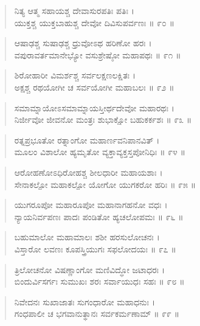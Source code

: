 \begin{verse}
ನಿತ್ಯ ಆತ್ಮ ಸಹಾಯಶ್ಚ ದೇವಾಸುರಪತಿಃ ಪತಿಃ ।\\ಯುಕ್ತಶ್ಚ ಯುಕ್ತಬಾಹುಶ್ಚ ದೇವೋ ದಿವಿಸುಪರ್ವಣಃ \num{॥ ೯೦ ॥}
\end{verse}

\begin{verse}
ಆಷಾಢಶ್ಚ ಸುಷಾಢಶ್ಚ ಧ್ರುವೋಽಥ ಹರಿಣೋ ಹರಃ ।\\ವಪುರಾವರ್ತಮಾನೇಭ್ಯೋ ವಸುಶ್ರೇಷ್ಠೋ ಮಹಾಪಥಃ \num{॥ ೯೧ ॥}
\end{verse}

\begin{verse}
ಶಿರೋಹಾರೀ ವಿಮರ್ಶಶ್ಚ ಸರ್ವಲಕ್ಷಣಲಕ್ಷಿತಃ ।\\ಅಕ್ಷಶ್ಚ ರಥಯೋಗೀ ಚ ಸರ್ವಯೋಗೀ ಮಹಾಬಲಃ \num{॥ ೯೨ ॥}
\end{verse}

\begin{verse}
ಸಮಾಮ್ನಾಯೋಽಸಮಾಮ್ನಾಯಸ್ತೀರ್ಥದೇವೋ ಮಹಾರಥಃ ।\\ನಿರ್ಜೀವೋ ಜೀವನೋ ಮಂತ್ರಃ ಶುಭಾಕ್ಷೋ ಬಹುಕರ್ಕಶಃ \num{॥ ೯೩ ॥}
\end{verse}

\begin{verse}
ರತ್ನಪ್ರಭೂತೋ ರತ್ನಾಂಗೋ ಮಹಾರ್ಣವನಿಪಾನವಿತ್ ।\\ಮೂಲಂ ವಿಶಾಲೋ ಹ್ಯಮೃತೋ ವ್ಯಕ್ತಾವ್ಯಕ್ತಸ್ತಪೋನಿಧಿಃ \num{॥ ೯೪ ॥}
\end{verse}

\begin{verse}
ಆರೋಹಣೋಽಧಿರೋಹಶ್ಚ ಶೀಲಧಾರೀ ಮಹಾಯಶಾಃ ।\\ಸೇನಾಕಲ್ಪೋ ಮಹಾಕಲ್ಪೋ ಯೋಗೋ ಯುಗಕರೋ ಹರಿಃ \num{॥ ೯೫ ॥}
\end{verse}

\begin{verse}
ಯುಗರೂಪೋ ಮಹಾರೂಪೋ ಮಹಾನಾಗಹನೋ ವಧಃ ।\\ನ್ಯಾಯನಿರ್ವಪಣಃ ಪಾದಃ ಪಂಡಿತೋ ಹ್ಯಚಲೋಪಮಃ \num{॥ ೯೬ ॥}
\end{verse}

\begin{verse}
ಬಹುಮಾಲೋ ಮಹಾಮಾಲಃ ಶಶೀ ಹರಸುಲೋಚನಃ ।\\ವಿಸ್ತಾರೋ ಲವಣಃ ಕೂಪಸ್ತ್ರಿಯುಗಃ ಸಫಲೋದಯಃ \num{॥ ೯೭ ॥}
\end{verse}

\begin{verse}
ತ್ರಿಲೋಚನೋ ವಿಷಣ್ಣಾಂಗೋ ಮಣಿವಿದ್ಧೋ ಜಟಾಧರಃ ।\\ಬಿಂದುರ್ವಿಸರ್ಗಃ ಸುಮುಖಃ ಶರಃ ಸರ್ವಾಯುಧಃ ಸಹಃ \num{॥ ೯೮ ॥}
\end{verse}

\begin{verse}
ನಿವೇದನಃ ಸುಖಾಜಾತಃ ಸುಗಂಧಾರೋ ಮಹಾಧನುಃ ।\\ಗಂಧಪಾಲೀ ಚ ಭಗವಾನುತ್ಥಾನಃ ಸರ್ವಕರ್ಮಣಾಮ್ \num{॥ ೯೯ ॥}
\end{verse}


